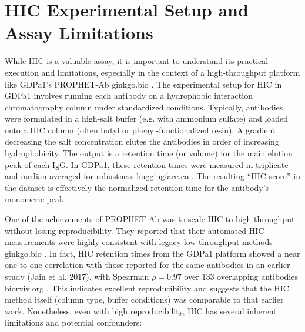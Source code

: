 \documentclass[12pt]{article}
\begin{document}
\section{HIC Experimental Setup and Assay Limitations}
While HIC is a valuable assay, it is important to understand its practical execution and limitations, especially in the context of a high-throughput platform like GDPa1’s PROPHET-Ab
ginkgo.bio
. The experimental setup for HIC in GDPa1 involves running each antibody on a hydrophobic interaction chromatography column under standardized conditions. Typically, antibodies were formulated in a high-salt buffer (e.g. with ammonium sulfate) and loaded onto a HIC column (often butyl or phenyl-functionalized resin). A gradient decreasing the salt concentration elutes the antibodies in order of increasing hydrophobicity. The output is a retention time (or volume) for the main elution peak of each IgG. In GDPa1, these retention times were measured in triplicate and median-averaged for robustness
huggingface.co
. The resulting “HIC score” in the dataset is effectively the normalized retention time for the antibody’s monomeric peak.

One of the achievements of PROPHET-Ab was to scale HIC to high throughput without losing reproducibility. They reported that their automated HIC measurements were highly consistent with legacy low-throughput methods
ginkgo.bio
. In fact, HIC retention times from the GDPa1 platform showed a near one-to-one correlation with those reported for the same antibodies in an earlier study (Jain et al. 2017), with Spearman $\rho=0.97$ over 133 overlapping antibodies
biorxiv.org
. This indicates excellent reproducibility and suggests that the HIC method itself (column type, buffer conditions) was comparable to that earlier work. Nonetheless, even with high reproducibility, HIC has several inherent limitations and potential confounders:
\end{document}
